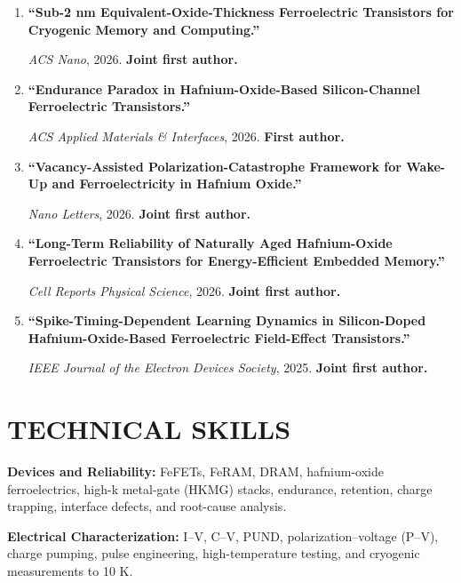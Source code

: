 \documentclass[10pt,a4paper]{article}
\begin{document}
\begin{enumerate}
  \item
  \textbf{``Sub-2 nm Equivalent-Oxide-Thickness Ferroelectric
  Transistors for Cryogenic Memory and Computing.''}\par
  \textit{ACS Nano}, 2026.
  \textbf{Joint first author.}

  \item
  \textbf{``Endurance Paradox in Hafnium-Oxide-Based
  Silicon-Channel Ferroelectric Transistors.''}\par
  \textit{ACS Applied Materials \& Interfaces}, 2026.
  \textbf{First author.}

  \item
  \textbf{``Vacancy-Assisted Polarization-Catastrophe Framework
  for Wake-Up and Ferroelectricity in Hafnium Oxide.''}\par
  \textit{Nano Letters}, 2026.
  \textbf{Joint first author.}

  \item
  \textbf{``Long-Term Reliability of Naturally Aged
  Hafnium-Oxide Ferroelectric Transistors for
  Energy-Efficient Embedded Memory.''}\par
  \textit{Cell Reports Physical Science}, 2026.
  \textbf{Joint first author.}

  \item
  \textbf{``Spike-Timing-Dependent Learning Dynamics in
  Silicon-Doped Hafnium-Oxide-Based Ferroelectric
  Field-Effect Transistors.''}\par
  \textit{IEEE Journal of the Electron Devices Society}, 2025.
  \textbf{Joint first author.}
\end{enumerate}

\section{TECHNICAL SKILLS}

\textbf{Devices and Reliability:}
FeFETs, FeRAM, DRAM, hafnium-oxide ferroelectrics,
high-k metal-gate (HKMG) stacks, endurance, retention,
charge trapping, interface defects, and root-cause analysis.\par

\textbf{Electrical Characterization:}
I--V, C--V, PUND, polarization--voltage (P--V),
charge pumping, pulse engineering, high-temperature testing,
and cryogenic measurements to 10 K.\par
\end{document}
